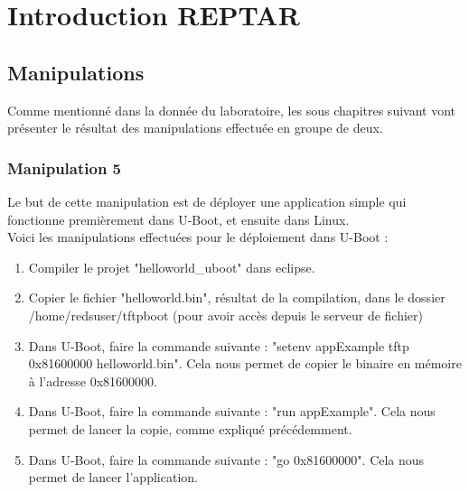 
\chapter{Introduction REPTAR} %

\label{Chapitre 2} %


\section{Manipulations}

Comme mentionné dans la donnée du laboratoire, les sous chapitres suivant vont présenter le résultat des manipulations effectuée en groupe de deux.

\subsection{Manipulation 5}
Le but de cette manipulation est de déployer une application simple qui fonctionne premièrement dans U-Boot, et ensuite dans Linux.\\

Voici les manipulations effectuées pour le déploiement dans U-Boot :
\begin{enumerate}
\item Compiler le projet "helloworld\_uboot" dans eclipse.
\item Copier le fichier "helloworld.bin", résultat de la compilation, dans le dossier /home/redsuser/tftpboot (pour avoir accès depuis le serveur de fichier)
\item Dans U-Boot, faire la commande suivante : "setenv appExample tftp 0x81600000 helloworld.bin". Cela nous permet de copier le binaire en mémoire à l'adresse 0x81600000.
\item Dans U-Boot, faire la commande suivante : "run appExample". Cela nous permet de lancer la copie, comme expliqué précédemment.
\item Dans U-Boot, faire la commande suivante : "go 0x81600000". Cela nous permet de lancer l'application.\\
\end{enumerate}

